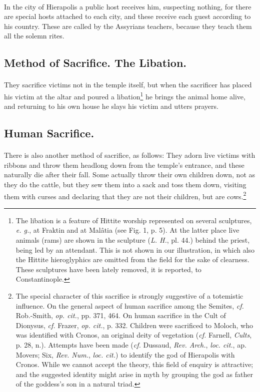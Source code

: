 \documentclass[a4paper, 11pt, oneside, polutonikogreek, english]{article}
\begin{document}
\paragraph{}
In the city of Hierapolis a public host receives him, suspecting nothing, for there are special hosts attached to each city, and these receive each guest according to his country. These are called by the Assyrians teachers, because they teach them all the solemn rites.

\subsection{Method of Sacrifice. The Libation.}
\paragraph{}
They sacrifice victims not in the temple itself, but when the sacrificer has placed his victim at the altar and poured a libation\footnote{The libation is a feature of Hittite worship represented on several sculptures, \emph{e. g.}, at Fraktin and at Malâtia (see Fig. 1, p. 5). At the latter place live animals (rams) are shown in the sculpture (\emph{L. H.}, pl. 44.) behind the priest, being led by an attendant. This is not shown in our illustration, in which also the Hittite hieroglyphics are omitted from the field for the sake of clearness. These sculptures have been lately removed, it is reported, to Constantinople.} he brings the animal home alive, and returning to his own house he slays his victim and utters prayers.

\subsection{Human Sacrifice.}
\paragraph{}
There is also another method of sacrifice, as follows: They adorn live victims with ribbons and throw them headlong down from the temple's entrance, and these naturally die after their fall. Some actually throw their own children down, not as they do the cattle, but they sew them into a sack and toss them down, visiting them with curses and declaring that they are not their children, but are cows.\footnote{The special character of this sacrifice is strongly suggestive of a totemistic influence. On the general aspect of human sacrifice among the Semites, \emph{cf.} Rob.-Smith, \emph{op. cit.}, pp. 371, 464. On human sacrifice in the Cult of Dionysus, \emph{cf.} Frazer, \emph{op. cit.}, p. 332. Children were sacrificed to Moloch, who was identified with Cronos, an original deity of vegetation (\emph{cf.} Farnell, \emph{Cults}, p. 28, n.). Attempts have been made (\emph{cf.} Dussaud, \emph{Rev. Arch.}, \emph{loc. cit.}, ap. Movers; Six, \emph{Rev. Num.}, \emph{loc. cit.}) to identify the god of Hierapolis with Cronos. While we cannot accept the theory, this field of enquiry is attractive; and the suggested identity might arise in myth by grouping the god as father of the goddess's son in a natural triad.}
\end{document}
